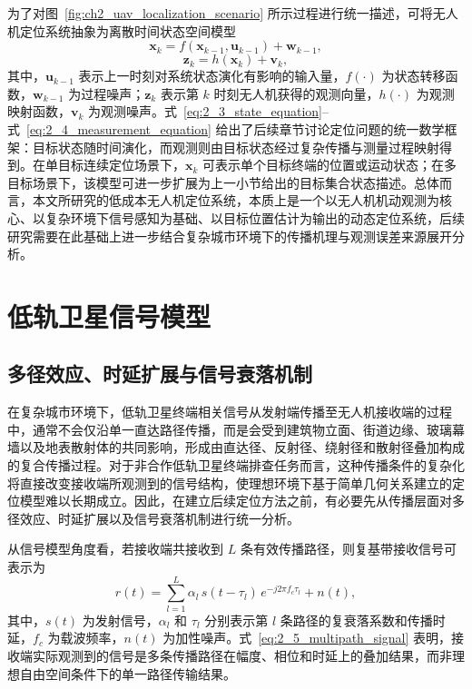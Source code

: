为了对图~\ref{fig:ch2_uav_localization_scenario} 所示过程进行统一描述，可将无人机定位系统抽象为离散时间状态空间模型
\begin{equation}
\mathbf{x}_{k}
=
f(\mathbf{x}_{k-1},\mathbf{u}_{k-1})+\mathbf{w}_{k-1},
\label{eq:2_3_state_equation}
\end{equation}
\begin{equation}
\mathbf{z}_{k}
=
h(\mathbf{x}_{k})+\mathbf{v}_{k},
\label{eq:2_4_measurement_equation}
\end{equation}
其中，$\mathbf{u}_{k-1}$ 表示上一时刻对系统状态演化有影响的输入量，$f(\cdot)$ 为状态转移函数，$\mathbf{w}_{k-1}$ 为过程噪声；$\mathbf{z}_k$ 表示第 $k$ 时刻无人机获得的观测向量，$h(\cdot)$ 为观测映射函数，$\mathbf{v}_k$ 为观测噪声。式~\eqref{eq:2_3_state_equation}--式~\eqref{eq:2_4_measurement_equation} 给出了后续章节讨论定位问题的统一数学框架：目标状态随时间演化，而观测则由目标状态经过复杂传播与测量过程映射得到。在单目标连续定位场景下，$\mathbf{x}_k$ 可表示单个目标终端的位置或运动状态；在多目标场景下，该模型可进一步扩展为上一小节给出的目标集合状态描述。总体而言，本文所研究的低成本无人机定位系统，本质上是一个以无人机机动观测为核心、以复杂环境下信号感知为基础、以目标位置估计为输出的动态定位系统，后续研究需要在此基础上进一步结合复杂城市环境下的传播机理与观测误差来源展开分析。


\section{低轨卫星信号模型}
\label{sec:2_2}

\subsection{多径效应、时延扩展与信号衰落机制}
\label{subsec:2_2_1}

在复杂城市环境下，低轨卫星终端相关信号从发射端传播至无人机接收端的过程中，通常不会仅沿单一直达路径传播，而是会受到建筑物立面、街道边缘、玻璃幕墙以及地表散射体的共同影响，形成由直达径、反射径、绕射径和散射径叠加构成的复合传播过程。对于非合作低轨卫星终端排查任务而言，这种传播条件的复杂化将直接改变接收端所观测到的信号结构，使理想环境下基于简单几何关系建立的定位模型难以长期成立。因此，在建立后续定位方法之前，有必要先从传播层面对多径效应、时延扩展以及信号衰落机制进行统一分析\cite{TR38901,Guvenc2009TOASurvey}。

从信号模型角度看，若接收端共接收到 $L$ 条有效传播路径，则复基带接收信号可表示为
\begin{equation}
r(t)
=
\sum_{l=1}^{L}
\alpha_l
\,s(t-\tau_l)\,
e^{-j2\pi f_c\tau_l}
+
n(t),
\label{eq:2_5_multipath_signal}
\end{equation}
其中，$s(t)$ 为发射信号，$\alpha_l$ 和 $\tau_l$ 分别表示第 $l$ 条路径的复衰落系数和传播时延，$f_c$ 为载波频率，$n(t)$ 为加性噪声。式~\eqref{eq:2_5_multipath_signal} 表明，接收端实际观测到的信号是多条传播路径在幅度、相位和时延上的叠加结果，而非理想自由空间条件下的单一路径传输结果。

